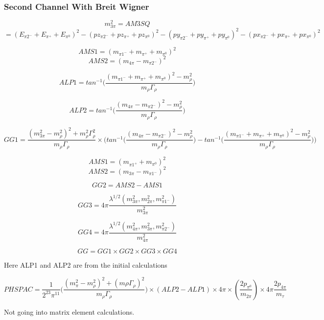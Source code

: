 \documentclass[12pt]{article}
\begin{document}
\subsubsection{Second Channel With Breit Wigner}

\[m_{3\pi}^2 = AM3SQ \]
\[= (E_{\pi2^{-}}+E_{\pi^+}+E_{\pi^0})^2 - (pz_{\pi2^{-}}+pz_{\pi^+}+pz_{\pi^0})^2- (py_{\pi2^-}+py_{\pi^+}+py_{\pi^0})^2- (px_{\pi2^-}+px_{\pi^+}+px_{\pi^0})^2\]

\[AMS1 = (m_{\pi1^-} + m_{\pi^+} + m_{\pi^0})^2\]
\[AMS2 = (m_{4\pi}-m_{\pi2^-})^2\]

\[ALP1 = tan^{-1}\Big(\frac{(m_{\pi1^-} + m_{\pi^+} + m_{\pi^0})^2 - m_\rho^2}{m_\rho \Gamma_\rho}\Big)\]

\[ALP2 = tan^{-1}\Big(\frac{(m_{4\pi}-m_{\pi2^-})^2 - m_\rho^2}{m_\rho \Gamma_\rho}\Big)\]


\[GG1 = \frac{(m_{3\pi}^2 - m_\rho^2)^2 + 	m_\rho^2 \Gamma_\rho^2}{m_\rho \Gamma_\rho} \times \Bigg(tan^{-1}\Big(\frac{(m_{4\pi}-m_{\pi2^-})^2 - m_\rho^2}{m_\rho \Gamma_\rho}\Big) -  tan^{-1}\Big(\frac{(m_{\pi1^-} + m_{\pi^+} + m_{\pi^0})^2 - m_\rho^2}{m_\rho \Gamma_\rho}\Big)  \Bigg)\]


\[AMS1 = (m_{\pi1^+} + m_{\pi^0})^2\]
\[AMS2 = (m_{3\pi}-m_{\pi1^-})^2\]


\[GG2=AMS2-AMS1\]

\[GG3 =  4\pi \frac{\lambda^{1/2}(m_{3\pi}^2, m_{2\pi}^2, m_{\pi1^-}^2)}{m_{3\pi}^2}\]

\[GG4 =  4\pi \frac{\lambda^{1/2}(m_{4\pi}^2, m_{3\pi}^2, m_{\pi2^-}^2)}{m_{4\pi}^2}\]


\[GG = GG1 \times GG2 \times GG3 \times GG4\]


Here ALP1 and ALP2 are from the initial calculations

\[PHSPAC = \frac{1}{2^{23}\pi^{11}}\Big( \frac{(m_\pi^2-m_\rho^2)^2+ (m\rho \Gamma_\rho)^2}{m_\rho \Gamma_\rho}\Big) \times (ALP2-ALP1) \times 4\pi \times (\frac{2 p_{\pi^0}}{m_{2\pi}}) \times 4\pi \frac{2p_{4\pi}}{m_\tau}\]


Not going into matrix element calculations.
\end{document}
